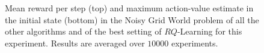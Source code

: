 \begin{figure}[t]
\begin{minipage}{\columnwidth}
\end{minipage}
  \caption[Noisy grid world algorithms comparison]{Mean reward per step (top) and maximum action-value estimate in the initial state (bottom) in the Noisy Grid World problem of all the other algorithms and of the best setting of $RQ$-Learning for this experiment. Results are averaged over $10000$ experiments.}
  \label{F:hasselt_all}
\end{figure}
\begin{figure}[t]
\begin{minipage}{\columnwidth}
\centering

\end{minipage}
\end{figure}
